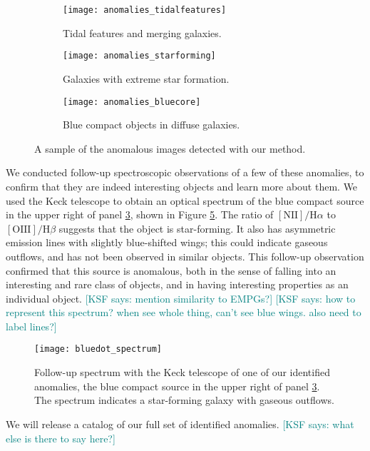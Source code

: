 \documentclass{article}
\newcommand{\KSF}[1]{\textcolor{teal}{{[KSF says: #1]}}}
\begin{document}
\begin{figure}[t!] 
\centering
\begin{subfigure}{.32\textwidth}
  \centering
  \texttt{[image: anomalies\_tidalfeatures]}  
  \caption{Tidal features and merging galaxies.}
  \label{fig:tidal}
  \end{subfigure}
\hfill
\begin{subfigure}{.32\textwidth}
  \centering
  \texttt{[image: anomalies\_starforming]}  
  \caption{Galaxies with extreme star formation.}
  \label{fig:starform}
\end{subfigure}
\hfill
\begin{subfigure}{.32\textwidth}
  \centering
  \texttt{[image: anomalies\_bluecore]}  
  \caption{Blue compact objects in diffuse galaxies.}
  \label{fig:bluecore}
\end{subfigure}
\caption{A sample of the anomalous images detected with our method.}
\label{fig:interesting}
\end{figure}

We conducted follow-up spectroscopic observations of a few of these anomalies, to confirm that they are indeed interesting objects and learn more about them. We used the Keck telescope to obtain an optical spectrum of the blue compact source in the upper right of panel \ref{fig:bluecore}, shown in Figure \ref{fig:spectrum}. The ratio of $\mathrm{[NII]/H}\alpha$ to $\mathrm{[OIII]/H}\beta$ suggests that the object is star-forming. It also has asymmetric emission lines with slightly blue-shifted wings; this could indicate gaseous outflows, and has not been observed in similar objects. This follow-up observation confirmed that this source is anomalous, both in the sense of falling into an interesting and rare class of objects, and in having interesting properties as an individual object.
\KSF{mention similarity to EMPGs?}
\KSF{how to represent this spectrum? when see whole thing, can't see blue wings. also need to label lines?}

\begin{figure} 
  \centering
  \texttt{[image: bluedot\_spectrum]}  
  \caption{Follow-up spectrum with the Keck telescope of one of our identified anomalies, the blue compact source in the upper right of panel \ref{fig:bluecore}. The spectrum indicates a star-forming galaxy with gaseous outflows.}
  \label{fig:spectrum}
\end{figure}

We will release a catalog of our full set of identified anomalies.  
\KSF{what else is there to say here?}
\end{document}
